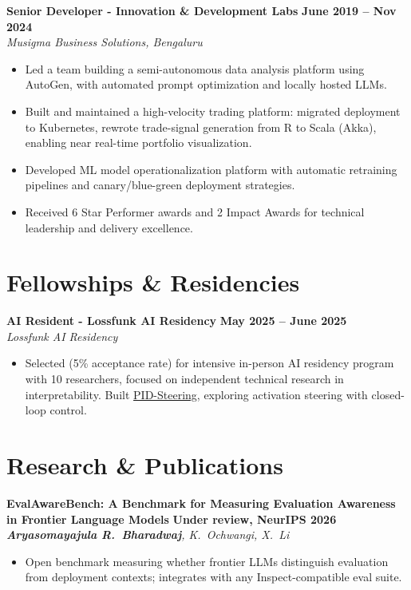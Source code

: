 \documentclass[11pt]{article}
\newcommand{\entrygap}{\vspace{8pt}}
\begin{document}
\entrygap
\textbf{Senior Developer - Innovation \& Development Labs} \hfill \textbf{June 2019 -- Nov 2024} \\
\textit{Musigma Business Solutions, Bengaluru}
\begin{itemize}[leftmargin=*, nosep]
\item Led a team building a semi-autonomous data analysis platform using AutoGen, with automated prompt optimization and  locally hosted LLMs.
\item Built and maintained a high-velocity trading platform: migrated deployment to Kubernetes, rewrote trade-signal generation from R to Scala (Akka), enabling near real-time portfolio visualization.
\item Developed ML model operationalization platform with automatic retraining pipelines and canary/blue-green deployment strategies.
\item Received 6 Star Performer awards and 2 Impact Awards for technical leadership and delivery excellence.
\end{itemize}

\section{Fellowships \& Residencies}

\textbf{AI Resident - Lossfunk AI Residency} \hfill \textbf{May 2025 -- June 2025} \\
\textit{Lossfunk AI Residency}
\begin{itemize}[leftmargin=*, nosep]
\item Selected (5\% acceptance rate) for intensive in-person AI residency program with 10 researchers, focused on independent technical research in interpretability. Built \href{https://github.com/arbdwj/pid_steering}{PID-Steering}, exploring activation steering with closed-loop control.
\end{itemize}

\section{Research \& Publications}

\textbf{EvalAwareBench: A Benchmark for Measuring Evaluation Awareness in Frontier Language Models} \hfill \textbf{Under review, NeurIPS 2026} \\
\textit{\textbf{Aryasomayajula R.~Bharadwaj}, K.~Ochwangi, X.~Li}
\begin{itemize}[leftmargin=*, nosep]
\item Open benchmark measuring whether frontier LLMs distinguish evaluation from deployment contexts; integrates with any Inspect-compatible eval suite.
\end{itemize}
\end{document}
